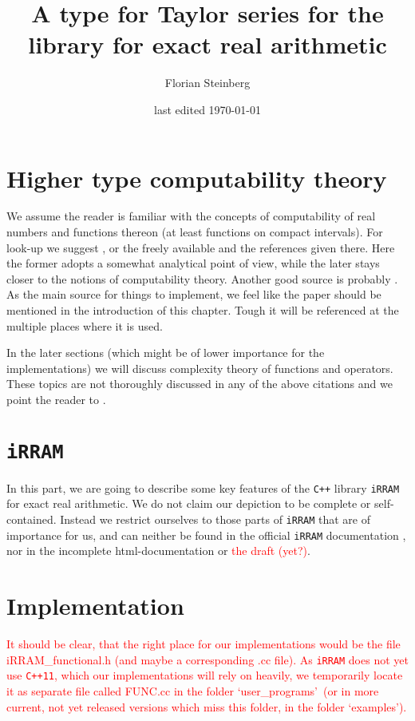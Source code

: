\documentclass{article}
\title{A type for Taylor series for the \cc library \irram for exact real arithmetic}
\date{last edited \today}
\author{Florian Steinberg}
\newcommand{\irram}{\texttt{iRRAM}\xspace}
\newcommand{\cc}{\texttt{C++}\xspace}
\newcommand{\ccOx}{\texttt{C++11}\xspace}
\newcommand{\temp}[1]{\textcolor{red}{#1}}
\begin{document}
\maketitle
\newpage
\tableofcontents
\newpage


\part{Higher type computability theory}

	We assume the reader is familiar with the concepts of computability of real numbers and functions thereon (at least functions on compact intervals).
	For look-up we suggest \cite{MR1005942}, or the freely available \cite{MR2762094} and the references given there.
	Here the former adopts a somewhat analytical point of view, while the later stays closer to the notions of computability theory.
	Another good source is probably \cite{MR1795407}.
	As the main source for things to implement, we feel like the paper \cite{gevrey} should be mentioned in the introduction of this chapter.
	Tough it will be referenced at the multiple places where it is used.

	In the later sections (which might be of lower importance for the implementations) we will discuss complexity theory of functions and operators.
	These topics are not thoroughly discussed in any of the above citations and we point the reader to \cite{}.

	
	
	

\part{\irram}

	In this part, we are going to describe some key features of the \cc library \irram for exact real arithmetic.
	We do not claim our depiction to be complete or self-contained.
	Instead we restrict ourselves to those parts of \irram that are of importance for us, and can neither be found in the official \irram documentation \cite{Muller2009}, nor in the incomplete html-documentation \cite{Muller2001-2003} or \temp{the draft} \cite{Muller2013} \temp{(yet?)}.

	
	
	

\part{Implementation}

	\temp{
		It should be clear, that the right place for our implementations would be the file iRRAM\_functional.h (and maybe a corresponding .cc file).
		As \irram does not yet use \ccOx, which our implementations will rely on heavily, we temporarily locate it as separate file called FUNC.cc in the folder \lq user\_programs\rq\ (or in more current, not yet released versions which miss this folder, in the folder \lq examples\rq).
	}
	
	
	
	

{}

\end{document}
